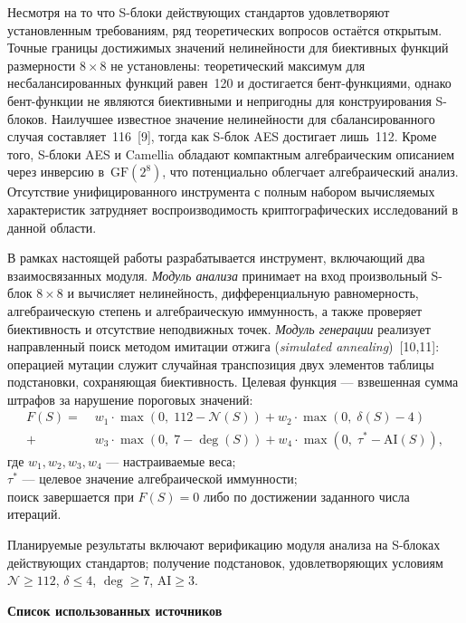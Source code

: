 \documentclass[10pt, a5paper]{extarticle}
\begin{document}
Несмотря на то что S-блоки действующих стандартов удовлетворяют
установленным требованиям, ряд теоретических вопросов остаётся открытым.
Точные границы достижимых значений нелинейности для биективных функций
размерности $8\times8$ не установлены: теоретический максимум для
несбалансированных функций равен~120 и достигается бент-функциями,
однако бент-функции не являются биективными и непригодны для
конструирования S-блоков. Наилучшее известное значение нелинейности
для сбалансированного случая составляет~116~[9], тогда как S-блок
AES достигает лишь~112. Кроме того, S-блоки AES и Camellia
обладают компактным алгебраическим описанием через инверсию
в~$\mathrm{GF}(2^8)$, что потенциально облегчает алгебраический анализ.
Отсутствие унифицированного инструмента с полным набором вычисляемых
характеристик затрудняет воспроизводимость криптографических
исследований в данной области.

В рамках настоящей работы разрабатывается инструмент, включающий два
взаимосвязанных модуля. \textit{Модуль анализа} принимает на вход
произвольный S-блок $8\times8$ и вычисляет нелинейность,
дифференциальную равномерность, алгебраическую степень и алгебраическую
иммунность, а также проверяет биективность и отсутствие неподвижных
точек. \textit{Модуль генерации} реализует направленный поиск методом
имитации отжига (\textit{simulated annealing})~[10,11]: операцией мутации
служит случайная транспозиция двух элементов таблицы подстановки,
сохраняющая биективность. Целевая функция --- взвешенная сумма штрафов
за нарушение пороговых значений:
\begin{align*}
  F(S) = \; & w_1\cdot\max(0,\;112-\mathcal{N}(S)) + w_2\cdot\max(0,\;\delta(S)-4)           \\
           + & w_3\cdot\max(0,\;7-\deg(S))             
           + w_4\cdot\max(0,\;\tau^*-\mathrm{AI}(S)),
\end{align*}
где $w_1, w_2, w_3, w_4$ --- настраиваемые веса;\\
\phantom{где} $\tau^*$ --- целевое значение алгебраической иммунности;\\
поиск завершается при $F(S)=0$ либо по достижении заданного числа
итераций.

Планируемые результаты включают верификацию модуля анализа на S-блоках
действующих стандартов; получение подстановок, удовлетворяющих условиям
$\mathcal{N}\geq112$, $\delta\leq4$, $\deg\geq7$, $\mathrm{AI} \geq 3$.

\vspace{0.5\baselineskip}
\noindent\textbf{Список использованных источников}
\vspace{0.2\baselineskip}
\end{document}
